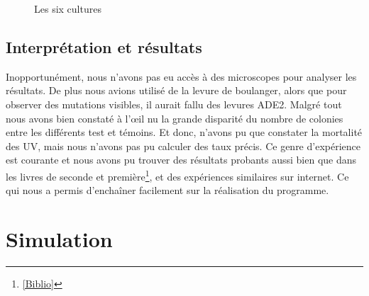     \begin{figure}
      \caption{Les six cultures}
    \end{figure}
  
\subsection{Interprétation et résultats}
  Inopportunément, nous n'avons pas eu accès à des microscopes pour analyser les résultats. De plus nous avions utilisé de la levure de boulanger, alors que pour observer des mutations visibles, il aurait fallu des levures ADE2. Malgré tout nous avons bien constaté à l'œil nu la grande disparité du nombre de colonies entre les différents test et témoins. Et donc, n'avons pu que constater la mortalité des UV, mais nous n'avons pas pu calculer des taux précis.
  Ce genre d'expérience est courante et nous avons pu trouver des résultats probants aussi bien que dans les livres de seconde et première\footnote{\ref{Biblio}}, et des expériences similaires sur internet. Ce qui nous a permis d'enchaîner facilement sur la réalisation du programme.

\section{Simulation}
  
  

